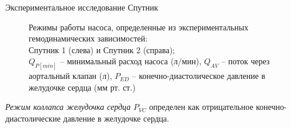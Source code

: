 \documentclass[a4paper, 9pt]{beamer}
\begin{document}
\begin{frame}{Экспериментальное исследование Спутник}
\begin{minipage}[ht]{0.49\textwidth}
\begin{figure}
\vskip-8pt\caption{\tiny Режимы работы насоса, определенные из экспериментальных гемодинамических зависимостей:\\ Спутник 1 (слева) и Спутник 2 (справа); \\ $Q_{P[min]}$ -- минимальный расход насоса (л/мин), $Q_{AV}$ -- поток через аортальный клапан (л), $P_{ED}$ -- конечно-диастолическое давление в желудочке сердца (мм рт. ст.)}
\end{figure}

\vskip-4pt
\tiny \emph{Режим коллапса желудочка сердца} $P_{VC}$ определен как отрицательное конечно-диастолические давление в желудочке сердца.

\end{minipage}

\end{frame}

\end{document}
